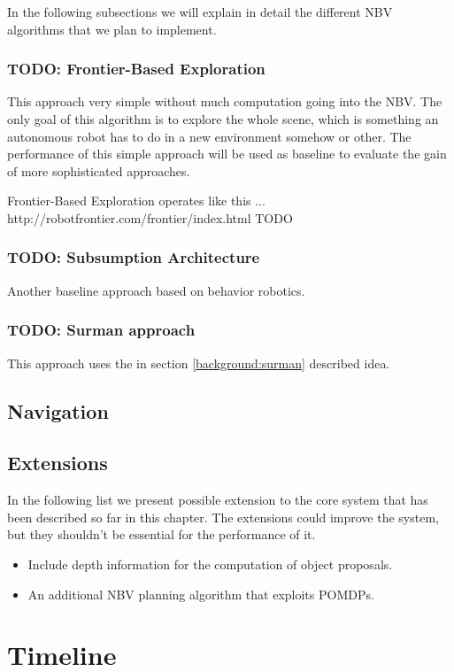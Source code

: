 \documentclass[a4paper,11pt,english]{article}
\begin{document}
In the following subsections we will explain in detail the different NBV algorithms that we plan to implement.

\subsubsection{TODO: Frontier-Based Exploration}
This approach very simple without much computation going into the NBV.
The only goal of this algorithm is to explore the whole scene, which is something an autonomous robot has to do in a new environment somehow or other.
The performance of this simple approach will be used as baseline to evaluate the gain of more sophisticated approaches.

Frontier-Based Exploration operates like this ... http://robotfrontier.com/frontier/index.html
TODO

\subsubsection{TODO: Subsumption Architecture}
Another baseline approach based on behavior robotics.

\subsubsection{TODO: Surman approach}
This approach uses the in section \ref{background:surman} described idea.

\subsection{Navigation}
\label{system:navigation}
\subsection{Extensions}
\label{system:extensions}
In the following list we present possible extension to the core system that has been described so far in this chapter. 
The extensions could improve the system, but they shouldn't be essential for the performance of it.

\begin{itemize}
	\item Include depth information for the computation of object proposals.
	\item An additional NBV planning algorithm that exploits POMDPs.
\end{itemize}

\section{Timeline}
\label{timeline}

\newpage


\end{document}
